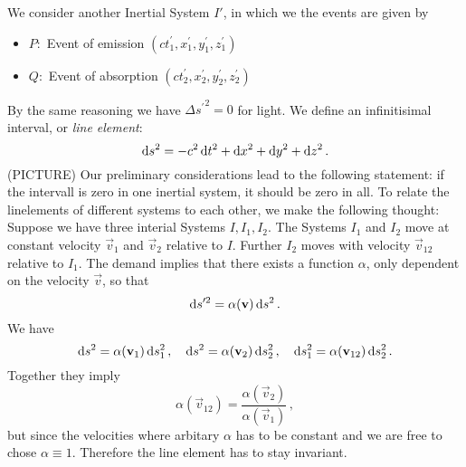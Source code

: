 We consider another Inertial System $I'$, in which we the events are given by
\begin{itemize}
  \item $P:$ Event of emission $(ct_1^\prime,x_1^\prime,y_1^\prime,z_1^\prime)$
  \item $Q:$ Event of absorption
  $(ct_2^\prime,x_2^\prime,y_2^\prime,z_2^\prime)$
\end{itemize}
By the same reasoning we have ${\Delta s^\prime}^2=0$ for light.
We define an infinitisimal interval, or \emph{line element}:
\begin{equation}
\dif s^2=-c^2\dif t^2+\dif x^2+\dif y^2+\dif z^2\, .
\end{equation}
(PICTURE)
Our preliminary considerations lead to the following statement: if the intervall
is zero in one inertial system, it should be zero in all. 
To relate the linelements of different systems to each other, we make the following thought:
Suppose we have three interial Systems $I,I_1,I_2$.
The Systems $I_1$ and $I_2$ move at constant velocity $\vec{v}_1$ and $\vec{v}_2$ relative to $I$. Further
$I_2$ moves with velocity $\vec{v}_{12}$ relative to $I_1$. The demand implies
that there exists a function $\alpha$, only dependent on the velocity $\vec{v}$,
so that
\begin{equation}
\dif s'^2=\alpha(\vec{v})\dif s^2\, .
\end{equation}
We have
\begin{equation}
\dif s^2=\alpha(\vec{v}_1)\dif s_1^2\, ,\quad\dif s^2=\alpha(\vec{v}_2)\dif
s_2^2\, ,\quad\dif s_1^2=\alpha(\vec{v}_{12})\dif s_2^2\, .
\end{equation}
Together they imply
\begin{equation}
\alpha(\vec{v}_{12})=\frac{\alpha(\vec{v}_{2})}{\alpha(\vec{v}_{1})}\, ,
\end{equation}
but since the velocities where arbitary $\alpha$ has to be constant and we are
free to chose $\alpha\equiv 1$. Therefore the line element has to stay
invariant.
